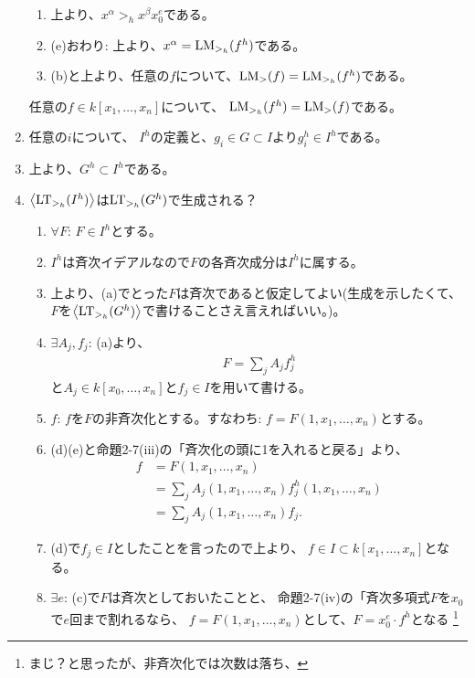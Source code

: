 \begin{myproof}
\begin{enumerate}
\begin{enumerate}
      \item
      上より、$x^\alpha >_h x^\beta x_0^e$である。
      \item
      (e)おわり: 上より、$x^\alpha = {\rm LM}_{>_h}(f^h)$である。
      \item (b)と上より、任意の$f$について、${\rm LM}_>(f) = {\rm LM}_{>_h}(f^h)$である。
    \end{enumerate}
    任意の$f\in k[x_1,\dots,x_n]$について、
    ${\rm LM}_{>_h}(f^h) = {\rm LM}_{>}(f)$である。
    \item 任意の$i$について、
    $I^h$の定義と、$g_i \in G \subset I$より$g_i^h \in I^h$である。
    \item
    上より、$G^h \subset I^h$である。
    \item
    $\left\langle {\rm LT}_{>_h}(I^h) \right\rangle$は${\rm LT}_{>_h}(G^h)$で生成される？
    \begin{enumerate}
      \item $\forall F$: $F\in I^h$とする。
      \item
      $I^h$は斉次イデアルなので$F$の各斉次成分は$I^h$に属する。
      \item
      上より、(a)でとった$F$は斉次であると仮定してよい(生成を示したくて、$F$を$\left\langle {\rm LT}_{>_h}(G^h) \right\rangle$で書けることさえ言えればいい。)。
      \item $\exists A_j,f_j$:
      (a)より、
      \begin{align}
        F= \sum_j A_j f_j^h
      \end{align}
      と$A_j \in k[x_0,\dots,x_n]$と$f_j \in I$を用いて書ける。
      \item
      $f$: $f$を$F$の非斉次化とする。すなわち:
      $f=F(1,x_1,\dots,x_n)$とする。
      \item
      (d)(e)と命題2-7(iii)の「斉次化の頭に1を入れると戻る」より、
      \begin{align}
        f
        &=
        F(1,x_1,\dots,x_n)\\
        &=
        \sum_j A_j(1,x_1,\dots,x_n)f_j^h(1,x_1,\dots,x_n)\\
        &=
        \sum_j A_j(1,x_1,\dots,x_n)f_j.
      \end{align}
      \item
      (d)で$f_j \in I$としたことを言ったので上より、
      $f\in I \subset k[x_1,\dots,x_n]$となる。
      \item $\exists e$:
      (c)で$F$は斉次としておいたことと、
      命題2-7(iv)の「斉次多項式$F$を$x_0$で$e$回まで割れるなら、
      $f=F(1,x_1,\dots,x_n)$として、$F=x_0^e\cdot f^h$となる
      \footnote{まじ？と思ったが、非斉次化では次数は落ち、
}
\end{enumerate}
\end{enumerate}
\end{myproof}

